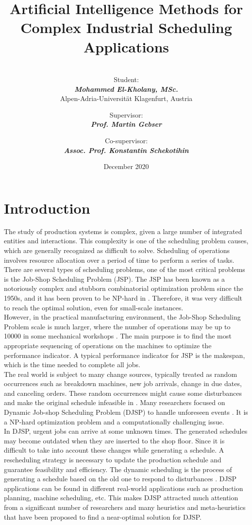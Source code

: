 \documentclass{article}
\title{\textbf{Artificial Intelligence Methods for Complex Industrial Scheduling Applications} \\}
\author{\\[1in] Student: \\ \textit{\textbf{Mohammed El-Kholany, MSc.}}\\Alpen-Adria-Universität Klagenfurt, Austria \\[1in] \and Supervisor:\\ \textit{\textbf{Prof. Martin Gebser}} \\ \and
Co-supervisor:\\ \textit{\textbf{Assoc. Prof. Konstantin Schekotihin}} \\[1in]}
\date{December 2020}
\begin{document}
\clearpage\maketitle
\thispagestyle{empty}
\clearpage
\setcounter{page}{1}
\newpage
\section{Introduction}
The study of production systems is complex, given a large number of integrated entities and interactions. This complexity is one of the scheduling problem causes, which are generally recognized as difficult to solve\cite{garey1979computers,lenstra1977complexity}. Scheduling of operations involves resource allocation over a period of time to perform a series of tasks. There are several types of scheduling problems, one of the most critical problems is the Job-Shop Scheduling Problem (JSP). The JSP has been known as a notoriously complex and stubborn combinatorial optimization problem since the 1950s, and it has been proven to be NP-hard in \cite{baker1974introduction,lenstra1979computational}. Therefore, it was very difficult to reach the optimal solution, even for small-scale instances.\\

However, in the practical manufacturing environment, the Job-Shop Scheduling Problem scale is much larger, where the number of operations may be up to 10000 in some mechanical workshops \cite{zhang2010hybrid}. The main purpose is to find the most appropriate sequencing of operations on the machines to optimize the performance indicator. A typical performance indicator for JSP is the makespan, which is the time needed to complete all jobs. \\

The real world is subject to many change sources, typically treated as random occurrences such as breakdown machines, new job arrivals, change in due dates, and canceling orders. These random occurrences might cause some disturbances and make the original schedule infeasible in \cite{salido2017rescheduling}. Many researchers focused on Dynamic Job-shop Scheduling Problem (DJSP) to handle unforeseen events \cite{zhang2017flexible,xiong2013robust, salido2017rescheduling}. It is a NP-hard optimization problem and a computationally challenging issue. \\

In DJSP, urgent jobs can arrive at some unknown times. The generated schedules may become outdated when they are inserted to the shop floor. Since it is difficult to take into account these changes while generating a schedule. A rescheduling strategy is necessary to update the production schedule and guarantee feasibility and efficiency. The dynamic scheduling is the process of generating a schedule based on the old one to respond to disturbances \cite{sajadi2019robust}. DJSP applications can be found in different real-world applications such as production planning, machine scheduling, etc. This makes DJSP attracted much attention from a significant number of researchers and many heuristics and meta-heuristics that have been proposed to find a near-optimal solution for DJSP. 
\end{document}
